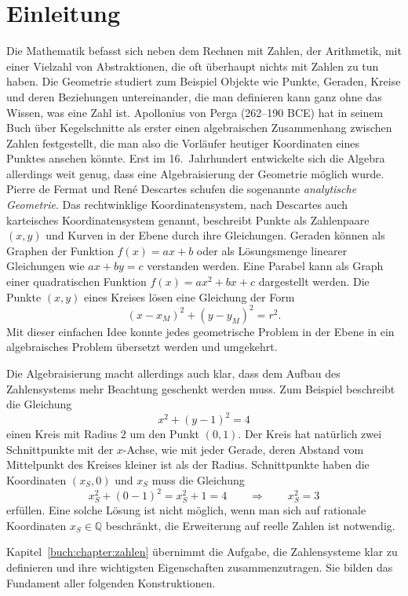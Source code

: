 %
%
%
\chapter*{Einleitung\label{chapter:einleitung}}
\rhead{}
Die Mathematik befasst sich neben dem Rechnen mit Zahlen, der Arithmetik,
mit einer Vielzahl von Abstraktionen, die oft überhaupt nichts mit 
Zahlen zu tun haben.
Die Geometrie studiert zum Beispiel Objekte wie Punkte, Geraden, Kreise
und deren Beziehungen untereinander, die man definieren kann ganz ohne
das Wissen, was eine Zahl ist.
Apollonius von Perga (262--190 BCE) hat in seinem Buch über Kegelschnitte
als erster einen algebraischen Zusammenhang zwischen Zahlen festgestellt,
die man also die Vorläufer heutiger Koordinaten eines Punktes ansehen könnte.
Erst im 16.~Jahrhundert entwickelte sich die Algebra allerdings weit genug,
dass eine Algebraisierung der Geometrie möglich wurde.
Pierre de Fermat
%
und René Descartes
%
schufen die sogenannte {\em analytische Geometrie}. 
Das rechtwinklige Koordinatensystem, nach Descartes auch karteisches
Koordinatensystem genannt, beschreibt Punkte als Zahlenpaare $(x,y)$
und Kurven in der Ebene durch ihre Gleichungen.
Geraden können als Graphen der Funktion $f(x) = ax+b$ oder als Lösungsmenge
linearer Gleichungen wie $ax+by=c$ verstanden werden.
Eine Parabel kann als Graph einer quadratischen Funktion $f(x)=ax^2+bx+c$
dargestellt werden.
Die Punkte $(x,y)$ eines Kreises lösen eine Gleichung der Form
\[
(x-x_M)^2 + (y-y_M)^2 = r^2.
\]
Mit dieser einfachen Idee konnte jedes geometrische Problem in der Ebene
in ein algebraisches Problem übersetzt werden und umgekehrt.

Die Algebraisierung macht allerdings auch klar, dass dem Aufbau des
Zahlensystems mehr Beachtung geschenkt werden muss.
Zum Beispiel beschreibt die Gleichung
\[
x^2+(y-1)^2=4
\]
einen Kreis mit Radius $2$ um den Punkt $(0,1)$.
Der Kreis hat natürlich zwei Schnittpunkte mit der $x$-Achse, wie mit jeder
Gerade, deren Abstand vom Mittelpunkt des Kreises kleiner ist als der Radius.
Schnittpunkte haben die Koordinaten $(x_S,0)$ und $x_S$ muss die
Gleichung
\[
x_S^2 + (0-1)^2 = x_S^2+1=4
\qquad\Rightarrow\qquad
x_S^2=3
\]
erfüllen.
Eine solche Lösung ist nicht möglich, wenn man sich auf rationale
Koordinaten $x_S\in\mathbb{Q}$ beschränkt, die Erweiterung auf
reelle Zahlen ist notwendig.

Kapitel~\ref{buch:chapter:zahlen} übernimmt die Aufgabe, die Zahlensysteme
klar zu definieren und ihre wichtigsten Eigenschaften zusammenzutragen.
Sie bilden das Fundament aller folgenden Konstruktionen.

